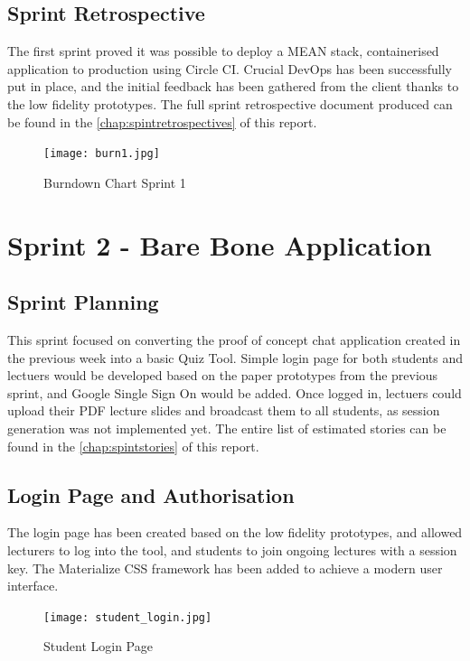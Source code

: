 \newpage
\subsection{Sprint Retrospective}
The first sprint proved it was possible to deploy a MEAN stack, containerised application
to production using Circle CI. Crucial DevOps has been successfully put in place, and the
initial feedback has been gathered from the client thanks to the low fidelity prototypes.
The full sprint retrospective document produced can be found in the \autoref{chap:spintretrospectives} of this report.

\begin{figure}[ht]
    \centering
    \texttt{[image: burn1.jpg]}
    \caption{Burndown Chart Sprint 1}
    \label{fig:burn1}
\end{figure}

\newpage
\section{Sprint 2 - Bare Bone Application}
\subsection{Sprint Planning}
This sprint focused on converting the proof of concept chat application created in the previous
week into a basic Quiz Tool. Simple login page for both students and lectuers
would be developed based on the paper prototypes from the previous sprint, and Google Single Sign
On would be added. Once logged in, lectuers could upload their PDF lecture slides and broadcast
them to all students, as session generation was not implemented yet. The entire list of estimated stories
can be found in the \autoref{chap:spintstories} of this report.

\newpage
\subsection{Login Page and Authorisation}
\label{sub:loginauth}
The login page has been created based on the low fidelity prototypes, and allowed
lecturers to log into the tool, and students to join ongoing lectures with a session key.
The Materialize\cite{43} CSS framework has been added to achieve a modern user interface.

\begin{figure}[h!]
    \centering
    \texttt{[image: student\_login.jpg]}
    \caption{Student Login Page}
    \label{fig:studentlogin}
\end{figure}

